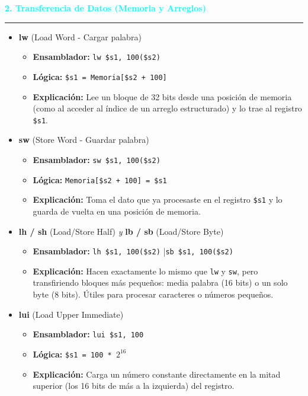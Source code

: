 \documentclass{article}
\begin{document}
\vspace{0.5cm}
\noindent\textcolor{cyan}{\Large\textbf{2. Transferencia de Datos (Memoria y Arreglos)}}
\vspace{0.2cm}\hrule\vspace{0.3cm}

\begin{itemize}
    \item \textbf{\large lw} (Load Word - Cargar palabra)
    \begin{itemize}
        \item \textbf{Ensamblador:} \texttt{lw \$s1, 100(\$s2)}
        \item \textbf{Lógica:} \texttt{\$s1 = Memoria[\$s2 + 100]}
        \item \textbf{Explicación:} Lee un bloque de 32 bits desde una posición de memoria (como al acceder al índice de un arreglo estructurado) y lo trae al registro \texttt{\$s1}.
    \end{itemize}
    \vspace{0.2cm}

    \item \textbf{\large sw} (Store Word - Guardar palabra)
    \begin{itemize}
        \item \textbf{Ensamblador:} \texttt{sw \$s1, 100(\$s2)}
        \item \textbf{Lógica:} \texttt{Memoria[\$s2 + 100] = \$s1}
        \item \textbf{Explicación:} Toma el dato que ya procesaste en el registro \texttt{\$s1} y lo guarda de vuelta en una posición de memoria.
    \end{itemize}
    \vspace{0.2cm}

    \item \textbf{\large lh / sh} (Load/Store Half) \textit{y} \textbf{\large lb / sb} (Load/Store Byte)
    \begin{itemize}
        \item \textbf{Ensamblador:} \texttt{lh \$s1, 100(\$s2)} \quad|\quad \texttt{sb \$s1, 100(\$s2)}
        \item \textbf{Explicación:} Hacen exactamente lo mismo que \texttt{lw} y \texttt{sw}, pero transfiriendo bloques más pequeños: media palabra (16 bits) o un solo byte (8 bits). Útiles para procesar caracteres o números pequeños.
    \end{itemize}
    \vspace{0.2cm}

    \item \textbf{\large lui} (Load Upper Immediate)
    \begin{itemize}
        \item \textbf{Ensamblador:} \texttt{lui \$s1, 100}
        \item \textbf{Lógica:} \texttt{\$s1 = 100 * $2^{16}$}
        \item \textbf{Explicación:} Carga un número constante directamente en la mitad superior (los 16 bits de más a la izquierda) del registro.
    \end{itemize}
\end{itemize}
\end{document}
